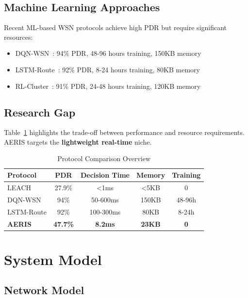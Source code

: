 \documentclass[11pt,a4paper]{article}
\begin{document}
\subsection{Machine Learning Approaches}

Recent ML-based WSN protocols achieve high PDR but require significant resources:
\begin{itemize}
    \item DQN-WSN~\cite{Khan2021}: 94\% PDR, 48-96 hours training, 150KB memory
    \item LSTM-Route~\cite{Ren2024}: 92\% PDR, 8-24 hours training, 80KB memory
    \item RL-Cluster~\cite{Okine2024}: 91\% PDR, 24-48 hours training, 120KB memory
\end{itemize}

\subsection{Research Gap}

Table~\ref{tab:comparison_overview} highlights the trade-off between performance and resource requirements. AERIS targets the \textbf{lightweight real-time} niche.

\begin{table}[H]
\centering
\caption{Protocol Comparison Overview}
\label{tab:comparison_overview}
\begin{tabular}{lcccc}
\toprule
\textbf{Protocol} & \textbf{PDR} & \textbf{Decision Time} & \textbf{Memory} & \textbf{Training} \\
\midrule
LEACH & 27.9\% & <1ms & <5KB & 0 \\
DQN-WSN & 94\% & 50-600ms & 150KB & 48-96h \\
LSTM-Route & 92\% & 100-300ms & 80KB & 8-24h \\
\textbf{AERIS} & \textbf{47.7\%} & \textbf{8.2ms} & \textbf{23KB} & \textbf{0} \\
\bottomrule
\end{tabular}
\end{table}

\section{System Model}

\subsection{Network Model}
\end{document}
